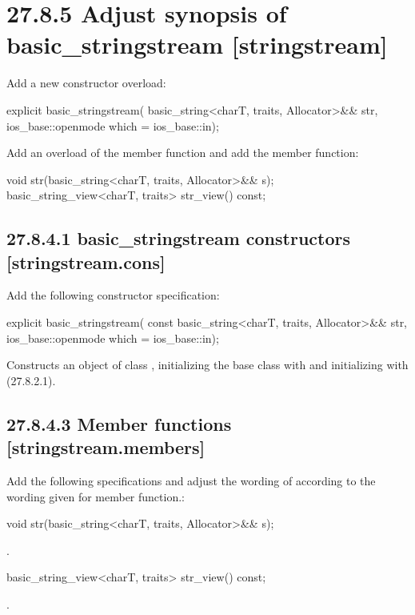 \documentclass[ebook,11pt,article]{memoir}
\begin{document}
\section{27.8.5 Adjust synopsis of basic\_stringstream [stringstream]}
Add a new constructor overload:
\begin{codeblock}
           explicit basic_stringstream(
             basic_string<charT, traits, Allocator>&& str,
             ios_base::openmode which = ios_base::in);
\end{codeblock}

Add an overload of the  member function and add the  member function:
\begin{codeblock}
void str(basic_string<charT, traits, Allocator>&& s);
basic_string_view<charT, traits> str_view() const;
\end{codeblock}

\subsection{27.8.4.1 basic\_stringstream constructors [stringstream.cons]}
Add the following constructor specification:
\begin{itemdecl}
explicit basic_stringstream(
  const basic_string<charT, traits, Allocator>&& str,
  ios_base::openmode which = ios_base::in);
\end{itemdecl}
\begin{itemdescr}
\pnum
\effects Constructs an object of class , initializing the base class with  and initializing  with  (27.8.2.1).
\end{itemdescr}
\subsection{27.8.4.3 Member functions [stringstream.members]}
Add the following specifications and adjust the wording of  according to the wording given for  member function.:
\begin{itemdecl}
void str(basic_string<charT, traits, Allocator>&& s);
\end{itemdecl}
\begin{itemdescr}
\pnum
\effects {}.
\end{itemdescr}
\begin{itemdecl}
basic_string_view<charT, traits> str_view() const;
\end{itemdecl}
\begin{itemdescr}
\pnum
\returns {}.
\end{itemdescr}
\end{document}
